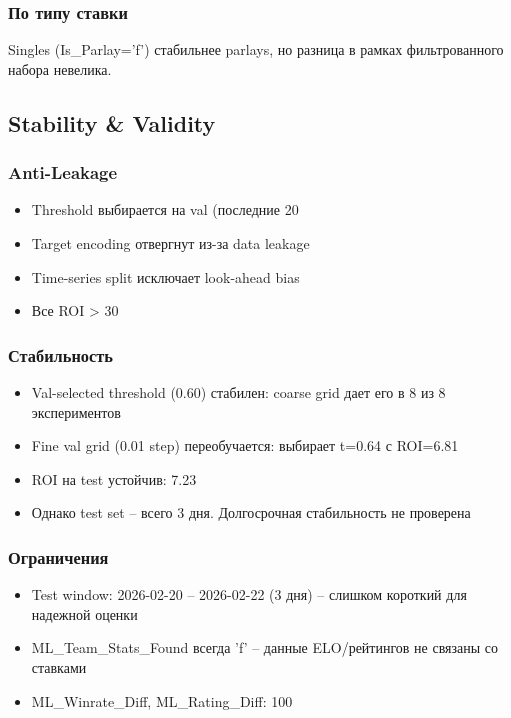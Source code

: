 \documentclass[12pt,a4paper]{article}
\begin{document}
\subsubsection{По типу ставки}
Singles (Is_Parlay='f') стабильнее parlays, но разница в рамках фильтрованного набора невелика.

\subsection{Stability & Validity}

\subsubsection{Anti-Leakage}
\begin{itemize}
  \item Threshold выбирается на val (последние 20%
  \item Target encoding отвергнут из-за data leakage
  \item Time-series split исключает look-ahead bias
  \item Все ROI > 30%
\end{itemize}

\subsubsection{Стабильность}
\begin{itemize}
  \item Val-selected threshold (0.60) стабилен: coarse grid дает его в 8 из 8 экспериментов
  \item Fine val grid (0.01 step) переобучается: выбирает t=0.64 с ROI=6.81%
  \item ROI на test устойчив: 7.23%
  \item Однако test set -- всего 3 дня. Долгосрочная стабильность не проверена
\end{itemize}

\subsubsection{Ограничения}
\begin{itemize}
  \item Test window: 2026-02-20 -- 2026-02-22 (3 дня) -- слишком короткий для надежной оценки
  \item ML_Team_Stats_Found всегда 'f' -- данные ELO/рейтингов не связаны со ставками
  \item ML_Winrate_Diff, ML_Rating_Diff: 100%
\end{itemize}
\end{document}
